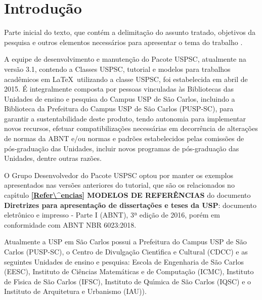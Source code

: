 
\chapter[Introdu\c{c}\~ao]{Introdu\c{c}\~ao}
\label{Introdu\c{c}\~ao}

Parte inicial do texto, que cont\'em a delimita\c{c}\~ao do assunto tratado, objetivos da pesquisa e outros elementos necess\'arios para apresentar o tema do trabalho \cite{aguia2020}.

A equipe de desenvolvimento e manuten\c{c}\~ao do Pacote USPSC, atualmente na vers\~ao 3.1, contendo a Classes USPSC, tutorial e modelos para trabalhos acad\^emicos em \LaTeX\ utilizando a classe USPSC, foi estabelecida em abril de 2015. \'E integralmente composta por pessoas vinculadas \`as Bibliotecas das Unidades de ensino e pesquisa do Campus USP de S\~ao Carlos, incluindo a Biblioteca da Prefeitura do Campus USP de S\~ao Carlos (PUSP-SC), para garantir a sustentabilidade deste produto, tendo autonomia para implementar novos recursos, efetuar compatibiliza\c{c}\~oes necess\'arias em decorr\^encia de altera\c{c}\~oes de normas da ABNT e/ou normas e padr\~oes estabelecidos pelas comiss\~oes de p\'os-gradua\c{c}\~ao das Unidades, incluir novos programas de p\'os-gradua\c{c}\~ao das Unidades, dentre outras raz\~oes.

O Grupo Desenvolvedor do Pacote USPSC optou por manter os exemplos apresentados nas vers\~oes anteriores do tutorial, que s\~ao os relacionados no cap\'{\i}tulo \textbf{\ref{Refer\^encias} MODELOS DE REFER\^ENCIAS} do documento \textbf{Diretrizes para apresenta\c{c}\~ao de disserta\c{c}\~oes e teses da USP}: documento eletr\^onico e impresso - Parte I (ABNT), 3ª edi\c{c}\~ao de 2016, por\'em em conformidade com ABNT NBR 6023:2018. 

Atualmente a USP em S\~ao Carlos possui a Prefeitura do Campus USP de S\~ao Carlos (PUSP-SC), o Centro de Divulga\c{c}\~ao Cient\'{\i}fica e Cultural (CDCC) e as seguintes Unidades de ensino e pesquisa: Escola de Engenharia de S\~ao Carlos (EESC), Instituto de Ci\^encias Matem\'aticas e de Computa\c{c}\~ao (ICMC), Instituto de F\'{\i}sica de S\~ao Carlos (IFSC), Instituto de Qu\'{\i}mica de S\~ao Carlos (IQSC) e o Instituto de Arquitetura e Urbanismo (IAU)).

